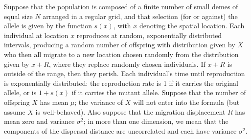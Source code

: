 \documentclass{article}
\begin{document}
Suppose that the population is composed of a finite number of small demes of equal size $N$ arranged in a regular grid,
and that selection (for or against) the allele is given by the function $s(x)$, with $x$ denoting the spatial location.
Each individual at location $x$ reproduces at random, exponentially distributed intervals,
producing a random number of offspring with distribution given by $X$
who then all migrate to a new location chosen randomly from the distribution given by $x+R$,
where they replace randomly chosen individuals.
If $x+R$ is outside of the range, then they perish.
Each individual's time until reproduction is exponentially distributed:
the reproduction rate is 1 if it carries the original allele, or is $1+s(x)$ if it carries the mutant allele.
Suppose that the number of offspring $X$ has mean $\mu$; the variance of $X$ will not enter into the formula
(but assume $X$ is well-behaved).
Also suppose that the migration displacement $R$ has mean zero and variance $\sigma^2$;
in more than one dimension, we mean that the components of the dispersal distance are uncorrelated
and each have variance $\sigma^2$.
\end{document}
